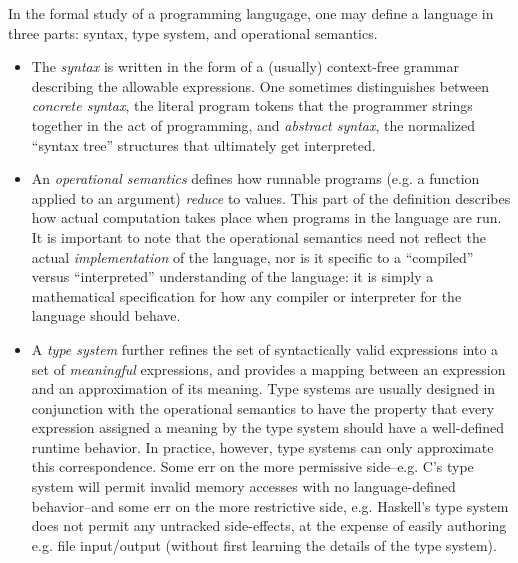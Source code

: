   In the formal study of a programming langugage, one may define a language
  in three parts: syntax, type system, and operational semantics.
  \begin{itemize}
    \item The {\em syntax} is written in the form of a (usually)
      context-free grammar describing the allowable expressions. One
      sometimes distinguishes between {\em concrete syntax}, the literal
      program tokens that the programmer strings together in the act of
      programming, and {\em abstract syntax}, the normalized ``syntax
      tree'' structures that ultimately get interpreted. 
    \item An {\em operational semantics} defines how runnable programs
      (e.g. a function applied to an argument) {\em reduce} to values. This
      part of the definition describes how actual computation takes place
      when programs in the language are run. It is important to note that
      the operational semantics need not reflect the actual {\em
      implementation} of the language, nor is it specific to a ``compiled''
      versus ``interpreted'' understanding of the language: it is simply a
      mathematical specification for how any compiler or interpreter for
      the language should behave.
    \item A {\em type system} further refines the set of syntactically
      valid expressions into a set of {\em meaningful} expressions, and provides
      a mapping between an expression and an approximation of its meaning.
      Type systems are usually designed in conjunction with the operational
      semantics to have the property that every expression assigned a
      meaning by the type system should have a well-defined runtime
      behavior. In practice, however, type systems can only approximate
      this correspondence. Some err on the more permissive side--e.g.
      C's type system will permit invalid memory accesses with no
      language-defined behavior--and some err on the more restrictive side,
      e.g. Haskell's type system does not permit any untracked
      side-effects, at the expense of easily authoring e.g. file input/output
      (without first learning the details of the type system).
  \end{itemize}
  
